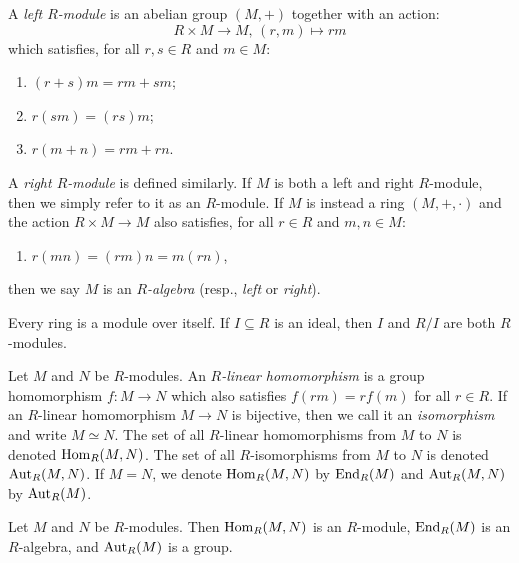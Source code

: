 \begin{definition}
	A \emph{left $R$-module} is an abelian group $(M,+)$ together with an action:
	\[
		R \times M \rightarrow M, \hspace{2pt} (r,m) \mapsto rm
	\] 
	which satisfies, for all $r,s \in R$ and $m \in M$:
	\mbox{}
	\begin{enumerate}[label = (\arabic*),itemsep=1pt,topsep=3pt]
		\item $(r+s)m = rm + sm$;
		\item $r(sm) = (rs)m$;
		\item $r(m+n) = rm + rn$.
	\end{enumerate}
	A \emph{right $R$-module} is defined similarly. If $M$ is both a left and right $R$-module, then we simply refer to it as an $R$-module. If $M$ is instead a ring $(M,+,\cdot)$ and the action $R \times M \rightarrow M$ also satisfies, for all $r \in R$ and $m,n \in M$:
	\mbox{}
	\begin{enumerate}[label = (\arabic*),itemsep=1pt,topsep=3pt]
		\addtocounter{enumi}{3}
		\item $r(mn) = (rm)n = m(rn)$,
	\end{enumerate}
	then we say $M$ is an \emph{$R$-algebra} (resp., \emph{left} or \emph{right}).
\end{definition}

\begin{example}
	Every ring is a module over itself. If $I \subseteq R$ is an ideal, then $I$ and $R/I$ are both $R$-modules.
\end{example}

\begin{definition}
	Let $M$ and $N$ be $R$-modules. An \emph{$R$-linear homomorphism} is a group homomorphism $f:M \rightarrow N$ which also satisfies $f(rm) = r f(m)$ for all $r \in R$. If an $R$-linear homomorphism $M \rightarrow N$ is bijective, then we call it an \emph{isomorphism} and write $M \simeq N$. The set of all $R$-linear homomorphisms from $M$ to $N$ is denoted $\operatorname{Hom}_R(M,N)$. The set of all $R$-isomorphisms from $M$ to $N$ is denoted $\operatorname{Aut}_R(M,N)$. If $M = N$, we denote $\operatorname{Hom}_R(M,N)$ by $\operatorname{End}_R(M)$ and $\operatorname{Aut}_R(M,N)$ by $\operatorname{Aut}_R(M)$.
\end{definition}

\begin{example}
	Let $M$ and $N$ be $R$-modules. Then $\operatorname{Hom}_R(M,N)$ is an $R$-module, $\operatorname{End}_R(M)$ is an $R$-algebra, and $\operatorname{Aut}_R(M)$ is a group.
\end{example}

